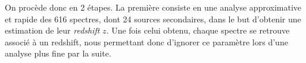 \documentclass[12pt, a4paper]{article}
\begin{document}
On procède donc en 2 étapes. La première consiste en une analyse approximative et rapide des 616 spectres, dont 24 sources secondaires, dans le but d'obtenir une estimation de leur \textit{redshift} $z$. Une fois celui obtenu, chaque spectre se retrouve associé à un redshift, nous permettant donc d'ignorer ce paramètre lors d'une analyse plus fine par la suite.


\newpage

\printnoidxglossaries

\newpage

\printbibliography %
\end{document}
